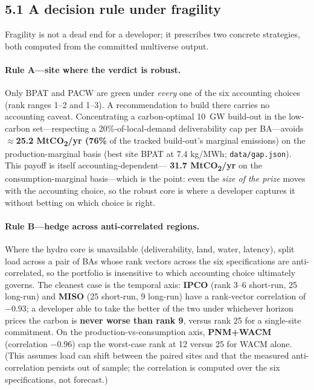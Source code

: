 \documentclass[11pt]{article}
\newcommand{\kgmwh}{kg/MWh}
\begin{document}
\subsection*{5.1 A decision rule under fragility}

Fragility is not a dead end for a developer; it prescribes two concrete
strategies, both computed from the committed multiverse output.

\paragraph{Rule A---site where the verdict is robust.}
Only BPAT and PACW are green under \emph{every} one of the six accounting choices
(rank ranges 1--2 and 1--3). A recommendation to build there carries no accounting
caveat. Concentrating a carbon-optimal 10~GW build-out in the low-carbon
set---respecting a 20\%-of-local-demand deliverability cap per BA---avoids
\textbf{$\approx$25.2 MtCO\textsubscript{2}/yr (76\%} of the tracked build-out's
marginal emissions) on the production-marginal basis (best site BPAT at 7.4
\kgmwh; \texttt{data/gap.json}). This payoff is itself accounting-dependent---%
\textbf{31.7 MtCO\textsubscript{2}/yr} on the consumption-marginal basis---which
is the point: even the \emph{size of the prize} moves with the accounting choice,
so the robust core is where a developer captures it without betting on which choice
is right.

\paragraph{Rule B---hedge across anti-correlated regions.}
Where the hydro core is unavailable (deliverability, land, water, latency), split
load across a pair of BAs whose rank vectors across the six specifications are
anti-correlated, so the portfolio is insensitive to which accounting choice
ultimately governs. The cleanest case is the temporal axis: \textbf{IPCO} (rank
3--6 short-run, 25 long-run) and \textbf{MISO} (25 short-run, 9 long-run) have a
rank-vector correlation of \textbf{$-0.93$}; a developer able to take the better of
the two under whichever horizon prices the carbon is \textbf{never worse than rank
9}, versus rank 25 for a single-site commitment. On the
production-vs-consumption axis, \textbf{PNM+WACM} (correlation \textbf{$-0.96$})
cap the worst-case rank at 12 versus 25 for WACM alone. (This assumes load can
shift between the paired sites and that the measured anti-correlation persists out
of sample; the correlation is computed over the six specifications, not forecast.)
\end{document}
